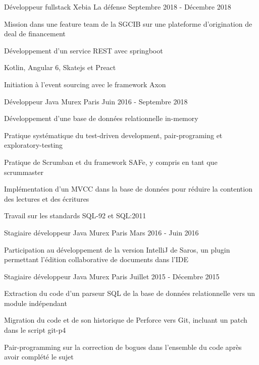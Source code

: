 
\begin{cventries}

\cventry
{Développeur fullstack}
{Xebia}
{La défense}
{Septembre 2018 - Décembre 2018}
{
	\begin{cvitems}
	\item{Mission dans une feature team de la SGCIB sur une plateforme d'origination de deal de financement}
	\item{Développement d'un service REST avec springboot}
	\item{Kotlin, Angular 6, Skatejs et Preact}
	\item{Initiation à l'event sourcing avec le framework Axon}
	\end{cvitems}
}

\cventry
{Développeur Java}
{Murex}
{Paris}
{Juin 2016 - Septembre 2018}
{
	\begin{cvitems}
	\item{Développement d'une base de données relationnelle in-memory}
	\item{Pratique systématique du test-driven development, pair-programing et exploratory-testing}
	\item{Pratique de Scrumban et du framework SAFe, y compris en tant que scrummaster}
	\item{Implémentation d'un MVCC dans la base de données pour réduire la contention des lectures et des écritures}
	\item{Travail sur les standards SQL-92 et SQL:2011}
	\end{cvitems}
}

\cventry
{Stagiaire développeur Java}
{Murex}
{Paris}
{Mars 2016 - Juin 2016}
{
	\begin{cvitems}
	\item{Participation au développement de la version IntelliJ de Saros, un plugin permettant l'édition collaborative de documents dans l'IDE}
	\end{cvitems}
}

\cventry
{Stagiaire développeur Java}
{Murex}
{Paris}
{Juillet 2015 - Décembre 2015}
{
	\begin{cvitems}
	\item{Extraction du code d'un parseur SQL de la base de données relationnelle vers un module indépendant}
	\item{Migration du code et de son historique de Perforce vers Git, incluant un patch dans le script git-p4}
	\item{Pair-programming sur la correction de bogues dans l'ensemble du code après avoir complété le sujet}
	\end{cvitems}
}


\end{cventries}
